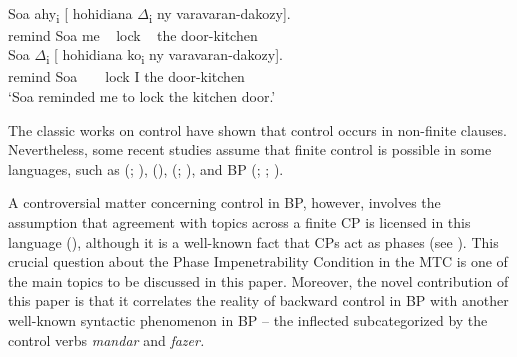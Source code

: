 \documentclass[output=paper]{langsci/langscibook}
\begin{document}
\ea%
     \citep[755]{Potsdam2009}\label{ex:moreno:4}\\
    \ea
     Soa  ahy\textsubscript{i} [ hohidiana ${\Delta}$\textsubscript{i}   ny varavaran-dakozy].\\
         remind                 Soa   me   ~ lock ~ the door-kitchen\\
    \ex
     Soa  ${\Delta}$\textsubscript{i}        [ hohidiana ko\textsubscript{i}   ny varavaran-dakozy].\\
         remind                    Soa    ~ ~ lock          I      the door-kitchen\\
    \glt ‘Soa reminded me to lock the kitchen door.’
    \z
\z

\noindent The classic works on control have shown that control occurs in non-finite clauses. Nevertheless, some recent studies assume that finite control is possible in some languages, such as  (\citealt{Yang1985}; \citealt{Borer1989}),  (\citealt{Suñer1988}),  (\citealt{Terzi1992,Modesto2000a,Modesto2000b}; \citealt{Alexiadou2010,Alexiadou2011}),  \citep{Uchibori2000} and BP (\citealt{Farrell1995}; \citealt{Rodrigues2004}; \citealt{Boeckx2006}).

A controversial matter concerning control in BP, however, involves the assumption that agreement with topics across a finite CP is licensed in this language (\citealt{Martins2005}), although it is a well-known fact that CPs act as phases (see \citealt{Chomsky2000}). This crucial question about the Phase Impenetrability Condition in the MTC is one of the main topics to be discussed in this paper. Moreover, the novel contribution of this paper is that it correlates the reality of backward control in BP with another well-known syntactic phenomenon in BP – the inflected  subcategorized by the control verbs \textit{mandar} and \textit{fazer.}

\end{document}
